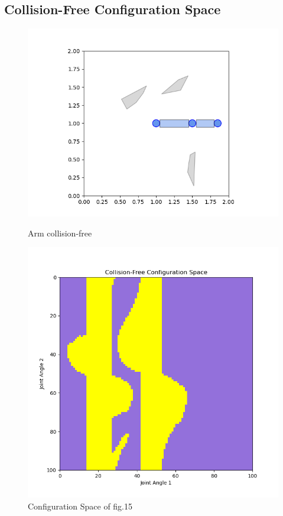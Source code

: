 \documentclass{article}
\begin{document}
\subsection{Collision-Free Configuration Space}
\begin{figure}[htbp]
  \centering
  \begin{minipage}{0.45\textwidth}
    \includegraphics[width=\linewidth]{part4_arm_free.png}
    \caption{Arm collision-free}
  \end{minipage}\hfill
  \begin{minipage}{0.45\textwidth}
    \includegraphics[width=\linewidth]{part4_cspace.png}
    \caption{Configuration Space of fig.15}
  \end{minipage}\hfill
\end{figure}
\end{document}
